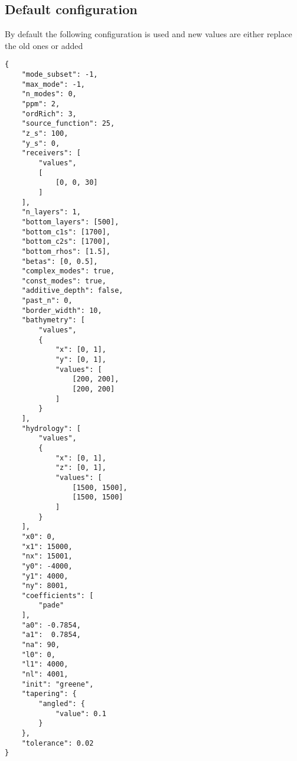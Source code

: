 \documentclass[12pt]{extarticle}
\begin{document}
        \subsection{Default configuration}
            \par By default the following configuration is used and new values are either replace the old ones or added
            \begin{verbatim}
{
    "mode_subset": -1,
    "max_mode": -1,
    "n_modes": 0,
    "ppm": 2,
    "ordRich": 3,
    "source_function": 25,
    "z_s": 100,
    "y_s": 0,
    "receivers": [
        "values",
        [
            [0, 0, 30]
        ]
    ],
    "n_layers": 1,
    "bottom_layers": [500],
    "bottom_c1s": [1700],
    "bottom_c2s": [1700],
    "bottom_rhos": [1.5],
    "betas": [0, 0.5],
    "complex_modes": true,
    "const_modes": true,
    "additive_depth": false,
    "past_n": 0,
    "border_width": 10,
    "bathymetry": [
        "values",
        {
            "x": [0, 1],
            "y": [0, 1],
            "values": [
                [200, 200],
                [200, 200]
            ]
        }
    ],
    "hydrology": [
        "values",
        {
            "x": [0, 1],
            "z": [0, 1],
            "values": [
                [1500, 1500],
                [1500, 1500]
            ]
        }
    ],
    "x0": 0,
    "x1": 15000,
    "nx": 15001,
    "y0": -4000,
    "y1": 4000,
    "ny": 8001,
    "coefficients": [
        "pade"
    ],
    "a0": -0.7854,
    "a1":  0.7854,
    "na": 90,
    "l0": 0,
    "l1": 4000,
    "nl": 4001,
    "init": "greene",
    "tapering": {
        "angled": {
            "value": 0.1
        }
    },
    "tolerance": 0.02
}
            \end{verbatim}
\end{document}
